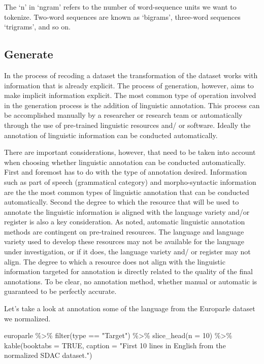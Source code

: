 \documentclass[
]{article}
\newenvironment{Shaded}{\begin{snugshade}}{\end{snugshade}}
\newcommand{\AttributeTok}[1]{\textcolor[rgb]{0.77,0.63,0.00}{#1}}
\newcommand{\ConstantTok}[1]{\textcolor[rgb]{0.00,0.00,0.00}{#1}}
\newcommand{\DecValTok}[1]{\textcolor[rgb]{0.00,0.00,0.81}{#1}}
\newcommand{\FunctionTok}[1]{\textcolor[rgb]{0.00,0.00,0.00}{#1}}
\newcommand{\NormalTok}[1]{#1}
\newcommand{\SpecialCharTok}[1]{\textcolor[rgb]{0.00,0.00,0.00}{#1}}
\newcommand{\StringTok}[1]{\textcolor[rgb]{0.31,0.60,0.02}{#1}}
\begin{document}
The `n' in `ngram' refers to the number of word-sequence units we want to tokenize. Two-word sequences are known as `bigrams', three-word sequences `trigrams', and so on.

\hypertarget{generate}{%
\subsection{Generate}\label{generate}}

In the process of recoding a dataset the transformation of the dataset works with information that is already explicit. The process of generation, however, aims to make implicit information explicit. The most common type of operation involved in the generation process is the addition of linguistic annotation. This process can be accomplished manually by a researcher or research team or automatically through the use of pre-trained linguistic resources and/ or software. Ideally the annotation of linguistic information can be conducted automatically.

There are important considerations, however, that need to be taken into account when choosing whether linguistic annotation can be conducted automatically. First and foremost has to do with the type of annotation desired. Information such as part of speech (grammatical category) and morpho-syntactic information are the the most common types of linguistic annotation that can be conducted automatically. Second the degree to which the resource that will be used to annotate the linguistic information is aligned with the language variety and/or register is also a key consideration. As noted, automatic linguistic annotation methods are contingent on pre-trained resources. The language and language variety used to develop these resources may not be available for the language under investigation, or if it does, the language variety and/ or register may not align. The degree to which a resource does not align with the linguistic information targeted for annotation is directly related to the quality of the final annotations. To be clear, no annotation method, whether manual or automatic is guaranteed to be perfectly accurate.

Let's take a look at annotation some of the language from the Europarle dataset we normalized.

\begin{Shaded}
\begin{Highlighting}[]
\NormalTok{europarle }\SpecialCharTok{\%\textgreater{}\%}
    \FunctionTok{filter}\NormalTok{(type }\SpecialCharTok{==} \StringTok{"Target"}\NormalTok{) }\SpecialCharTok{\%\textgreater{}\%}
    \FunctionTok{slice\_head}\NormalTok{(}\AttributeTok{n =} \DecValTok{10}\NormalTok{) }\SpecialCharTok{\%\textgreater{}\%}
    \FunctionTok{kable}\NormalTok{(}\AttributeTok{booktabs =} \ConstantTok{TRUE}\NormalTok{, }\AttributeTok{caption =} \StringTok{"First 10 lines in English from the normalized SDAC dataset."}\NormalTok{)}
\end{Highlighting}
\end{Shaded}
\end{document}
